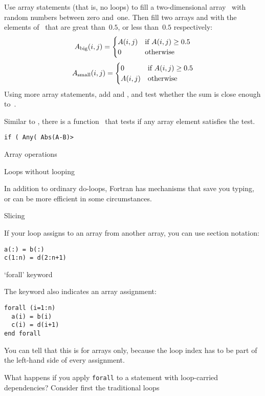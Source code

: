 \begin{exercise}
  Use array statements (that is, no loops) to fill a two-dimensional
  array~ with random numbers between zero and~one. Then fill two
  arrays  and  with the elements of~ that are
  great than~$0.5$, or less than~$0.5$ respectively:
  \[ A_{\scriptstyle\mathrm{big}}(i,j) =
  \begin{cases}
    A(i,j)&\hbox{if $A(i,j)\geq 0.5$}\\ 0&\hbox{otherwise}
  \end{cases}
  \]
  \[ A_{\scriptstyle\mathrm{small}}(i,j) =
  \begin{cases}
    0&\hbox{if $A(i,j)\geq 0.5$}\\ A(i,j)&\hbox{otherwise}
  \end{cases}
  \]
  Using more array statements, add  and , and test
  whether the sum is close enough to~.
\end{exercise}

Similar to , there is a function~ that tests
if any array element satisfies the test.
\begin{lstlisting}
if ( Any( Abs(A-B)>
\end{lstlisting}

 {Array operations}

 {Loops without looping}

In addition to ordinary do-loops, Fortran has mechanisms that save you
typing, or can be more efficient in some circumstances.

 {Slicing}

If your loop assigns to an array from another array,
  you can use section notation:
\begin{lstlisting}
a(:) = b(:)
c(1:n) = d(2:n+1)
\end{lstlisting}

 {`forall' keyword}

The  keyword also indicates an array assignment:
\begin{lstlisting}
forall (i=1:n)
  a(i) = b(i)
  c(i) = d(i+1)
end forall
\end{lstlisting}
You can tell that this is for arrays only, because the loop index has
to be part of the left-hand side of every assignment.

What happens if you apply \lstinline{forall} to a statement
with loop-carried dependencies?
Consider first the traditional loops

